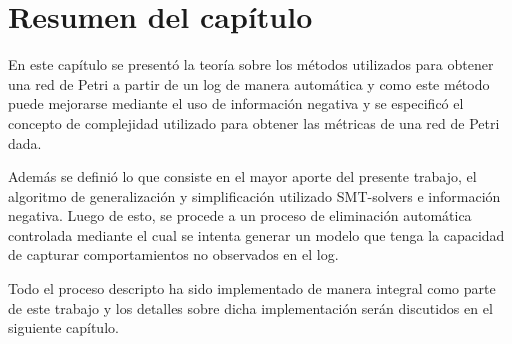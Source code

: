 \section{Resumen del capítulo}
\label{sec:3.resumen}

En este capítulo se presentó la teoría sobre los métodos utilizados para obtener una red de Petri
a partir de un log de manera automática y como este método puede mejorarse mediante el uso de información
negativa y se especificó el concepto de complejidad utilizado para obtener las métricas de una red de
Petri dada.

Además se definió lo que consiste en el mayor aporte del presente trabajo, el  algoritmo de
generalización y simplificación utilizado SMT-solvers e información negativa.
Luego de esto, se procede a un proceso de eliminación automática controlada mediante el cual se intenta 
generar un modelo que tenga la capacidad de capturar comportamientos no observados en el log.

Todo el proceso descripto ha sido implementado de manera integral como parte de este trabajo
y los detalles sobre dicha implementación serán discutidos en el siguiente capítulo.
